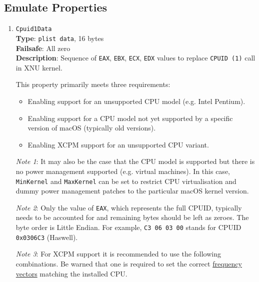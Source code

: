 \documentclass[]{article}
\providecommand{\tightlist}{%
  \setlength{\itemsep}{0pt}\setlength{\parskip}{0pt}}
\begin{document}
\subsection{Emulate Properties}\label{kernelpropsemu}

\begin{enumerate}
\item
  \texttt{Cpuid1Data}\\
  \textbf{Type}: \texttt{plist\ data}, 16 bytes\\
  \textbf{Failsafe}: All zero\\
  \textbf{Description}: Sequence of \texttt{EAX}, \texttt{EBX}, \texttt{ECX},
  \texttt{EDX} values to replace \texttt{CPUID (1)} call in XNU kernel.

  This property primarily meets three requirements:

  \begin{itemize}
    \tightlist
    \item Enabling support for an unsupported CPU model (e.g. Intel Pentium).
    \item Enabling support for a CPU model not yet supported by a specific version of macOS (typically old versions).
    \item Enabling XCPM support for an unsupported CPU variant.
  \end{itemize}

  \emph{Note 1}: It may also be the case that the CPU model is supported but there is no power management supported
  (e.g. virtual machines). In this case, \texttt{MinKernel} and \texttt{MaxKernel} can be set to restrict CPU virtualisation and dummy power
  management patches to the particular macOS kernel version.

  \emph{Note 2}: Only the value of \texttt{EAX}, which represents the full CPUID,
  typically needs to be accounted for and remaining bytes should be left as zeroes.
  The byte order is Little Endian. For example, \texttt{C3 06 03 00} stands for CPUID
  \texttt{0x0306C3} (Haswell).

  \emph{Note 3}: For XCPM support it is recommended to use the following combinations.
  Be warned that one is required to set the correct
  \href{https://github.com/dortania/bugtracker/issues/190}{frequency vectors} matching
  the installed CPU.


\end{enumerate}
\end{document}
